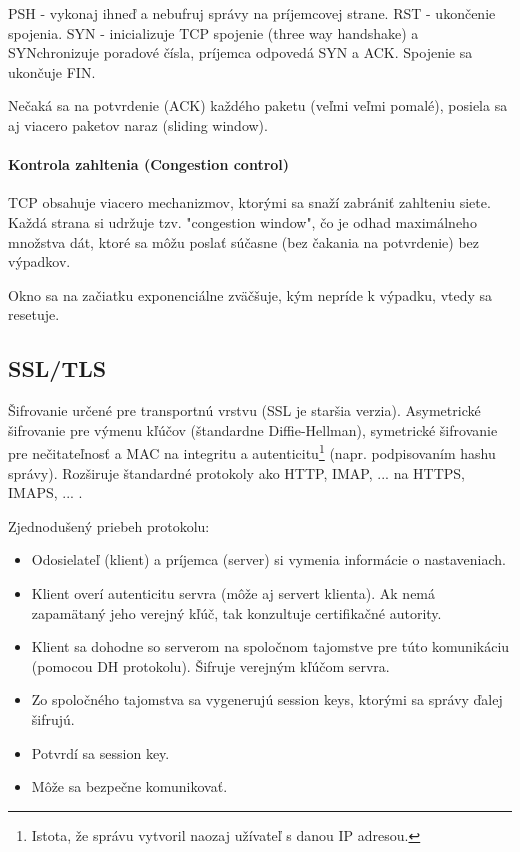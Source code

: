 \documentclass[10pt,a4paper]{article}
\begin{document}
PSH - vykonaj ihneď a nebufruj správy na príjemcovej strane. RST - ukončenie spojenia. 
SYN - inicializuje TCP spojenie (three way handshake) a SYNchronizuje poradové čísla,
príjemca odpovedá SYN a ACK. Spojenie sa ukončuje FIN. 

Nečaká sa na potvrdenie (ACK) každého paketu (veľmi veľmi pomalé), posiela sa aj viacero paketov naraz (sliding window). 

\paragraph{Kontrola zahltenia (Congestion control)}

TCP obsahuje viacero mechanizmov, ktorými sa snaží zabrániť zahlteniu siete. Každá strana si udržuje tzv. "congestion window", čo je odhad maximálneho množstva dát, ktoré sa môžu poslať súčasne (bez čakania na potvrdenie) bez výpadkov.

Okno sa na začiatku exponenciálne zväčšuje, kým nepríde k výpadku, vtedy sa resetuje. 

\subsection{SSL/TLS}                 
Šifrovanie určené pre transportnú vrstvu (SSL je staršia verzia). 
Asymetrické šifrovanie pre výmenu kľúčov (štandardne Diffie-Hellman), 
symetrické šifrovanie pre nečitateľnosť a
MAC na integritu a autenticitu\footnote{
Istota, že správu vytvoril naozaj užívateľ s danou IP adresou. 
} (napr. podpisovaním hashu správy). 
Rozširuje štandardné protokoly ako HTTP, IMAP, ... na HTTPS, IMAPS, ... .

Zjednodušený priebeh protokolu:
\begin{itemize}
\item Odosielateľ (klient) a príjemca (server) si vymenia informácie o nastaveniach. 
\item Klient overí autenticitu servra (môže aj servert klienta). Ak nemá zapamätaný jeho verejný kľúč, tak konzultuje certifikačné autority. 
\item Klient sa dohodne so serverom na spoločnom tajomstve pre túto komunikáciu (pomocou DH protokolu). Šifruje verejným kľúčom servra. 
\item Zo spoločného tajomstva sa vygenerujú session keys, ktorými sa správy ďalej šifrujú. 
\item Potvrdí sa session key. 
\item Môže sa bezpečne komunikovať.
\end{itemize} 
\end{document}
